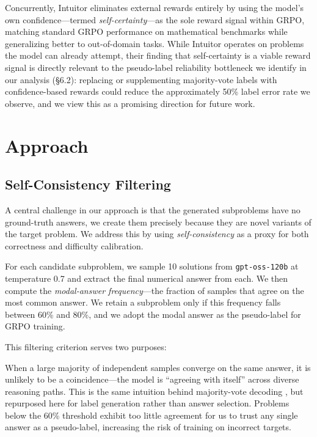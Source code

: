 \documentclass{article}
\begin{document}
Concurrently, Intuitor \cite{intuitor} eliminates external rewards entirely by using the model's own confidence—termed \textit{self-certainty}—as the sole reward signal within GRPO, matching standard GRPO performance on mathematical benchmarks while generalizing better to out-of-domain tasks. While Intuitor operates on problems the model can already attempt, their finding that self-certainty is a viable reward signal is directly relevant to the pseudo-label reliability bottleneck we identify in our analysis (\S6.2): replacing or supplementing majority-vote labels with confidence-based rewards could reduce the approximately 50\% label error rate we observe, and we view this as a promising direction for future work.


\section{Approach}
\subsection{Self-Consistency Filtering}
 
A central challenge in our approach is that the generated subproblems have no ground-truth answers, we create them precisely because they are novel variants of the target problem. We address this by using \emph{self-consistency} as a proxy for both correctness and difficulty calibration.
 
For each candidate subproblem, we sample 10 solutions from \texttt{gpt-oss-120b} at temperature 0.7 and extract the final numerical answer from each. We then compute the \emph{modal-answer frequency}---the fraction of samples that agree on the most common answer. We retain a subproblem only if this frequency falls between 60\% and 80\%, and we adopt the modal answer as the pseudo-label for GRPO training.
 
This filtering criterion serves two purposes:
 
When a large majority of independent samples converge on the same answer, it is unlikely to be a coincidence---the model is ``agreeing with itself'' across diverse reasoning paths. This is the same intuition behind majority-vote decoding \cite{selfconsistency}, but repurposed here for label generation rather than answer selection. Problems below the 60\% threshold exhibit too little agreement for us to trust any single answer as a pseudo-label, increasing the risk of training on incorrect targets.
 
\end{document}
